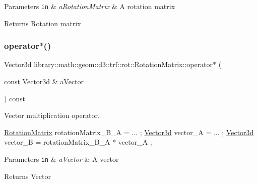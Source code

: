 \begin{DoxyParams}[1]{Parameters}
\mbox{\tt in}  & {\em a\+Rotation\+Matrix} & A rotation matrix \\
\hline
\end{DoxyParams}
\begin{DoxyReturn}{Returns}
Rotation matrix 
\end{DoxyReturn}
\mbox{\label{classlibrary_1_1math_1_1geom_1_1d3_1_1trf_1_1rot_1_1_rotation_matrix_a1b21bbea44cea009ae0533e206b202ff}} 
\subsubsection{\texorpdfstring{operator$\ast$()}{operator*()}\hspace{0.1cm}{\footnotesize\ttfamily [2/2]}}
{\footnotesize\ttfamily Vector3d library\+::math\+::geom\+::d3\+::trf\+::rot\+::\+Rotation\+Matrix\+::operator$\ast$ (\begin{DoxyParamCaption}\item[{const Vector3d \&}]{a\+Vector }\end{DoxyParamCaption}) const}



Vector multiplication operator. 


\begin{DoxyCode}
\hyperlink{classlibrary_1_1math_1_1geom_1_1d3_1_1trf_1_1rot_1_1_rotation_matrix_a7f1184694020cb4f963d58931324ab06}{RotationMatrix} rotationMatrix\_B\_A = ... ;
\hyperlink{namespacelibrary_1_1math_1_1obj_a977e84e9bf317a4e7dd9d6d671d6da2f}{Vector3d} vector\_A = ... ;
\hyperlink{namespacelibrary_1_1math_1_1obj_a977e84e9bf317a4e7dd9d6d671d6da2f}{Vector3d} vector\_B = rotationMatrix\_B\_A * vector\_A ;
\end{DoxyCode}



\begin{DoxyParams}[1]{Parameters}
\mbox{\tt in}  & {\em a\+Vector} & A vector \\
\hline
\end{DoxyParams}
\begin{DoxyReturn}{Returns}
Vector 
\end{DoxyReturn}
\mbox{\label{classlibrary_1_1math_1_1geom_1_1d3_1_1trf_1_1rot_1_1_rotation_matrix_adb54de25b2dbdd55ecd6d122f47b5996}} 
